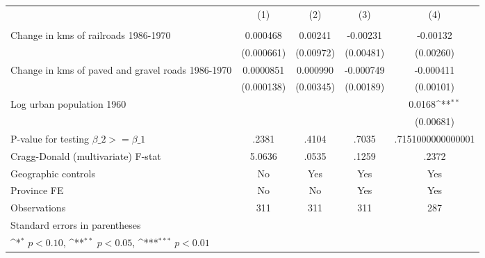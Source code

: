 {
\def\sym#1{\ifmmode^{#1}\else\(^{#1}\)\fi}
\begin{tabular}{l*{4}{c}}
\hline\hline
                &\multicolumn{1}{c}{(1)}&\multicolumn{1}{c}{(2)}&\multicolumn{1}{c}{(3)}&\multicolumn{1}{c}{(4)}\\
                &\multicolumn{1}{c}{}&\multicolumn{1}{c}{}&\multicolumn{1}{c}{}&\multicolumn{1}{c}{}\\
\hline
Change in kms of railroads 1986-1970& 0.000468         &  0.00241         & -0.00231         & -0.00132         \\
                &(0.000661)         &(0.00972)         &(0.00481)         &(0.00260)         \\
[1em]
Change in kms of paved and gravel roads 1986-1970&0.0000851         & 0.000990         &-0.000749         &-0.000411         \\
                &(0.000138)         &(0.00345)         &(0.00189)         &(0.00101)         \\
[1em]
Log urban population 1960&                  &                  &                  &   0.0168\sym{**} \\
                &                  &                  &                  &(0.00681)         \\
\hline
P-value for testing $\beta\_{2} >= \beta\_{1}$&    .2381         &    .4104         &    .7035         &.7151000000000001         \\
Cragg-Donald (multivariate) F-stat&   5.0636         &    .0535         &    .1259         &    .2372         \\
Geographic controls&       No         &      Yes         &      Yes         &      Yes         \\
Province FE     &       No         &       No         &      Yes         &      Yes         \\
Observations    &      311         &      311         &      311         &      287         \\
\hline\hline
\multicolumn{5}{l}{\footnotesize Standard errors in parentheses}\\
\multicolumn{5}{l}{\footnotesize \sym{*} \(p<0.10\), \sym{**} \(p<0.05\), \sym{***} \(p<0.01\)}\\
\end{tabular}
}
